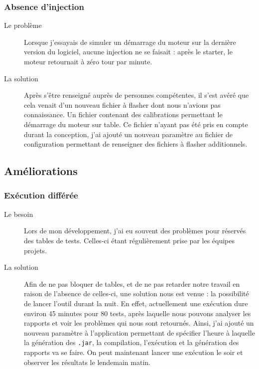 	\subsubsection{Absence d'injection}
	\begin{description}
		\item[Le problème] Lorsque j'essayais de simuler un démarrage du moteur sur la dernière version du logiciel, aucune injection ne se faisait : après le starter, le moteur retournait à zéro tour par minute.
		\item[La solution] Après s'être renseigné auprès de personnes compétentes, il s'est avéré que cela venait d'un nouveau fichier à flasher dont nous n'avions pas connaissance. Un fichier contenant des calibrations permettant le démarrage du moteur sur table. Ce fichier n'ayant pas été pris en compte durant la conception, j'ai ajouté un nouveau paramètre au fichier de configuration permettant de renseigner des fichiers à flasher additionnels.
	\end{description}
	
\subsection{Améliorations}
	\subsubsection{Exécution différée} %
	\begin{description}
		\item[Le besoin] Lors de mon développement, j'ai eu souvent des problèmes pour réservés des tables de tests. Celles-ci étant régulièrement prise par les équipes projets. 
		\item[La solution] Afin de ne pas bloquer de tables, et de ne pas retarder notre travail en raison de l'absence de celles-ci, une solution nous est venue : la possibilité de lancer l'outil durant la nuit. En effet, actuellement une exécution dure environ 45 minutes pour 80 tests, après laquelle nous pouvons analyser les rapports et voir les problèmes qui nous sont retournés. Ainsi, j'ai ajouté un nouveau paramètre à l'application permettant de spécifier l'heure à laquelle la génération des \texttt{.jar}, la compilation, l'exécution et la génération des rapports va se faire. On peut maintenant lancer une exécution le soir et observer les résultats le lendemain matin.
	\end{description}
	
